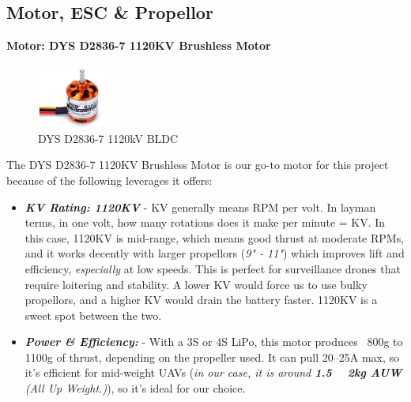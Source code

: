 \documentclass[12pt]{report}
\begin{document}
      \subsection{Motor, ESC \& Propellor}
      \vspace{0.5cm}
      
      \textbf{Motor: DYS D2836-7 1120KV Brushless Motor} \\
      \begin{figure}
        \includegraphics[width=0.2\textwidth]{bldc.png}
        \caption{DYS D2836-7 1120kV BLDC}
        \label{fig:bldc1120}
      \end{figure}
      The DYS D2836-7 1120KV Brushless Motor is our go-to motor for this project because of the following leverages it offers:
        
      \begin{itemize}
        \item \textbf{\textit{KV Rating: 1120KV}} - KV generally means RPM per volt. In layman terms, in one volt, how many rotations does it make per minute = KV. In this case, 1120KV is mid-range, which means good thrust at moderate RPMs, and it works decently with larger propellors (\textit{9" - 11"}) which improves lift and efficiency, \textit{especially} at low speeds. This is perfect for surveillance drones that require loitering and stability. A lower KV would force us to use bulky propellors, and a higher KV would drain the battery faster. 1120KV is a sweet spot between the two.
        \item \textbf{\textit{Power \& Efficiency:}} - With a 3S or 4S LiPo, this motor produces ~800g to 1100g of thrust, depending on the propeller used. It can pull 20–25A max, so it's efficient for mid-weight UAVs (\textit{in our case, it is around \textbf{1.5 ~ 2kg AUW} (All Up Weight.)}), so it's ideal for our choice.
      \end{itemize}
      \renewcommand{\arraystretch}{1.5}
      
\end{document}
